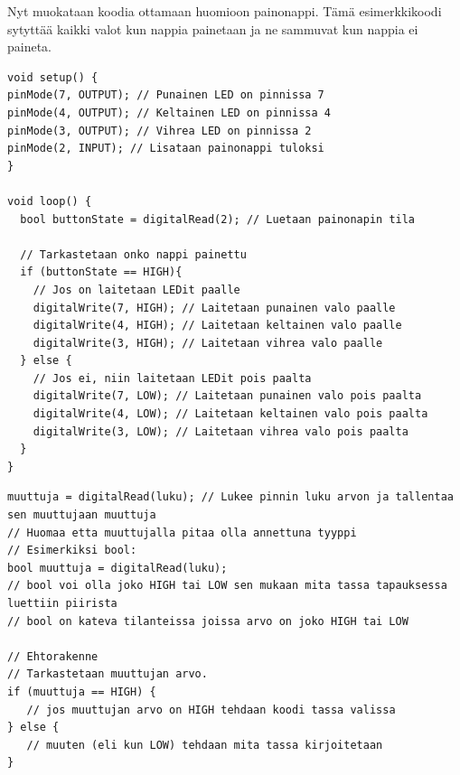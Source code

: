 

\clearpage
Nyt muokataan koodia ottamaan huomioon painonappi. Tämä esimerkkikoodi sytyttää kaikki valot kun nappia painetaan ja ne sammuvat kun nappia ei paineta.

\begin{lstlisting}[numbers=none]
void setup() {
pinMode(7, OUTPUT); // Punainen LED on pinnissa 7
pinMode(4, OUTPUT); // Keltainen LED on pinnissa 4
pinMode(3, OUTPUT); // Vihrea LED on pinnissa 2
pinMode(2, INPUT); // Lisataan painonappi tuloksi
}

void loop() {
  bool buttonState = digitalRead(2); // Luetaan painonapin tila

  // Tarkastetaan onko nappi painettu
  if (buttonState == HIGH){
    // Jos on laitetaan LEDit paalle
    digitalWrite(7, HIGH); // Laitetaan punainen valo paalle
    digitalWrite(4, HIGH); // Laitetaan keltainen valo paalle
    digitalWrite(3, HIGH); // Laitetaan vihrea valo paalle
  } else {
    // Jos ei, niin laitetaan LEDit pois paalta
    digitalWrite(7, LOW); // Laitetaan punainen valo pois paalta
    digitalWrite(4, LOW); // Laitetaan keltainen valo pois paalta
    digitalWrite(3, LOW); // Laitetaan vihrea valo pois paalta
  }
}
\end{lstlisting}

\begin{tcolorbox}[colback=white,title=Vinkkejä Arduinolla koodaamiseen!,colbacktitle=purple!90]
\begin{lstlisting}
muuttuja = digitalRead(luku); // Lukee pinnin luku arvon ja tallentaa sen muuttujaan muuttuja
// Huomaa etta muuttujalla pitaa olla annettuna tyyppi
// Esimerkiksi bool:
bool muuttuja = digitalRead(luku); 
// bool voi olla joko HIGH tai LOW sen mukaan mita tassa tapauksessa luettiin piirista
// bool on kateva tilanteissa joissa arvo on joko HIGH tai LOW

// Ehtorakenne
// Tarkastetaan muuttujan arvo.
if (muuttuja == HIGH) {
   // jos muuttujan arvo on HIGH tehdaan koodi tassa valissa
} else {
   // muuten (eli kun LOW) tehdaan mita tassa kirjoitetaan
}
\end{lstlisting}
\end{tcolorbox}

